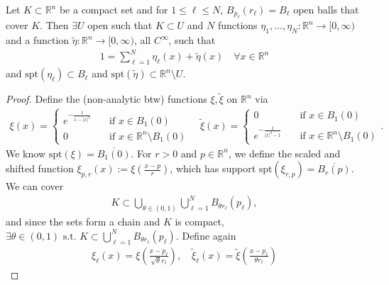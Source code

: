 \begin{lemma}\label{lem:part-of-unity}
    Let $K \subset \mathbb{R}^{n}$ be a compact set and for $1 \leq \ell \leq N$, $B_{p_{\ell}}(r_{\ell}) = B_{\ell}$ open balls that cover $K$. Then $\exists U$ open such that $K \subset U$ and $N$ functions $\eta_{1}, \dots, \eta_{N}: \mathbb{R}^{n} \to [0,\infty)$ and a function $\tilde{\eta}: \mathbb{R}^{n} \to [0,\infty)$, all $C^{\infty}$, such that
    \begin{align*}
        1 = \sum_{\ell=1}^{N} \eta_{\ell}(x) + \tilde{\eta}(x) \quad \forall x \in \mathbb{R}^{n} 
    \end{align*}
    and $\text{spt}(\eta_{\ell}) \subset B_{\ell}$ and $\text{spt}(\tilde{\eta}) \subset \mathbb{R}^{n} \setminus U$. 
\end{lemma}
\begin{proof}
    Define the (non-analytic btw) functions $\xi, \tilde{\xi}$ on $\mathbb{R}^{n}$ via
    \begin{align*}
        \xi(x) = 
        \begin{cases}
            e^{ - \frac{1}{1-\left| x \right|^{2}} } \quad & \text{if } x \in B_{1}(0) \\ 
            0 \quad & \text{if } x \in \mathbb{R}^{n} \setminus B_{1}(0) 
        \end{cases}
        \quad 
        \tilde{\xi}(x) = 
        \begin{cases}
            0 \quad & \text{if } x \in B_{1}(0) \\ 
            e^{ -\frac{1}{\left| x \right|^{2}-1} } \quad & \text{if } x \in \mathbb{R}^{n} \setminus B_{1}(0) 
        \end{cases}.
    \end{align*}
    We know $\text{spt}(\xi) = \overline{ B_{1}(0) }$. For $r > 0$ and $p \in \mathbb{R}^{n}$, we define the scaled and shifted function $\xi_{p,r}(x) := \xi(\frac{x-p}{r})$, which has support $\text{spt}(\xi_{r,p}) = \overline{ B_{r}(p) } $. We can cover
    \begin{align*}
        K \subset \bigcup_{\theta \in (0,1)} \bigcup_{\ell=1}^{N} B_{\theta r_{\ell}}(p_{\ell}),
    \end{align*}
    and since the sets form a chain and $K$ is compact, $\exists \theta \in (0,1) \text{ s.t. } K \subset \bigcup_{\ell=1}^{N} B_{\theta r_{\ell}}(p_{\ell})$. Define again
    \begin{align*}
        \xi_{\ell}(x) = \xi \left( \frac{x-p_{\ell}}{\sqrt{\theta} r_{\ell}} \right), \quad \tilde{\xi}_{\ell}(x) = \tilde{\xi}\left( \frac{x - p_{\ell}}{\theta r_{\ell}} \right)

\end{align*}
\end{proof}
